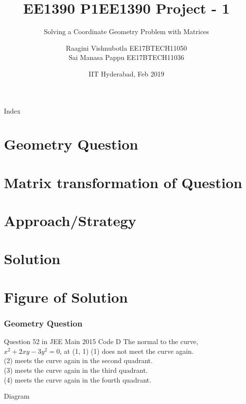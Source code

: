 \documentclass{beamer}
\title[Project]{EE1390 P1}
\title{EE1390 Project - 1}
\subtitle{Solving a Coordinate  Geometry Problem with Matrices}
\author{Raagini Vishnubotla EE17BTECH11050 \\
   Sai Manasa Pappu EE17BTECH11036}
\date{IIT Hyderabad, Feb 2019}
\begin{document}
\begin{frame}
\titlepage 
\end{frame}


\begin{frame}{Index}
  \tableofcontents
\end{frame}

\section{Geometry Question}
\section{Matrix transformation of Question}
\section{Approach/Strategy}
\section{Solution}
\section{Figure of Solution}


\begin{frame}
\frametitle{Geometry Question}
\begin{block}{Question 52 in JEE Main 2015 Code D}
\bigbreak
The normal to the curve, $x^2 + 2xy - 3y^2 = 0$, at (1, 1) 
\bigbreak
(1) does not meet the curve again.\\
(2) meets the curve again in the second quadrant.\\
(3) meets the curve again in the third quadrant.\\
(4) meets the curve again in the fourth quadrant.
\bigbreak
\end{block}
\end{frame}


\begin{frame}{Diagram}
\end{frame}
\end{document}
